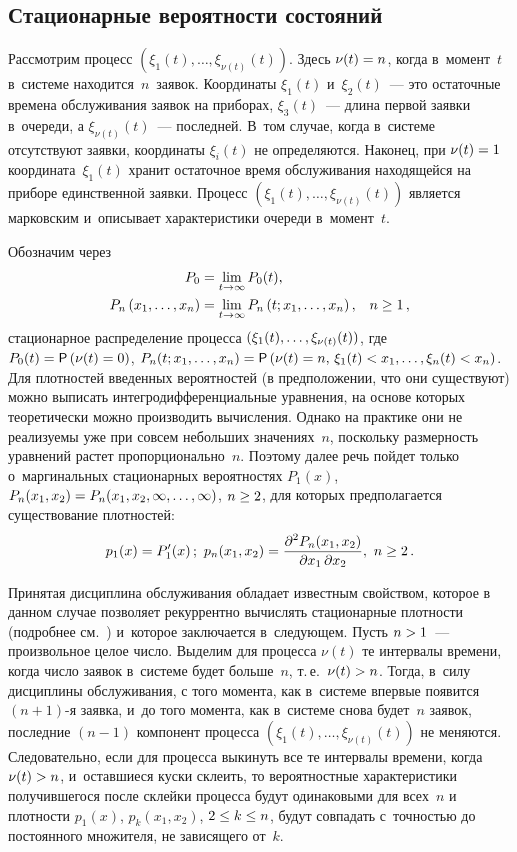 \begin{multicols}{2}
\section{Стационарные вероятности состояний}


Рассмотрим процесс $(\xi_{1}(t),\ldots,\xi_{\nu(t)}(t))$.
Здесь $\nu(t)\hm=n$, когда в~момент~$t$ в~системе находится~$n$~заявок. 
Координаты $\xi_{1}(t)$ и~$\xi_{2}(t)$~--- это
остаточные времена обслуживания заявок на приборах,
$\xi_{3}(t)$~--- длина первой заявки в~очереди, а
$\xi_{\nu(t)}(t)$~--- последней.
В~том случае, когда в~системе отсутствуют заявки, 
координаты $\xi_i(t)$ не определяются.
Наконец, при $\nu(t)\hm=1$ координата~$\xi_{1}(t)$
хранит остаточное время обслуживания находящейся на приборе 
единственной заявки.
Процесс $(\xi_{1}(t),\ldots,\xi_{\nu(t)}(t))$
является марковским и~описывает характеристики очереди в~момент~$t$.

Обозначим через
\begin{align*}
P_{0}&=
\lim\limits_{t\to\infty}
P_{0}(t),
\\
P_{n}\left(x_1,\ldots,x_{n}\right)
&=
\lim\limits_{t\to\infty}
P_{n}\left(t;x_1,\ldots,x_{n}\right),\enskip \ n\ge 1\,,
\end{align*}
\noindent стационарное распределение процесса 
$(\xi_{1}(t),\hm\ldots,\xi_{\nu(t)}(t))$,
где $P_{0}(t)\hm=\mathsf{P} \left (\nu(t)\hm=0 \right )$,
$P_{n}(t;x_1,\hm\ldots,x_{n})\hm=\mathsf{P}\left (\nu(t)\hm=n,\, 
\xi_{1}(t)<x_{1},\hm\ldots,\xi_{n}(t)\hm<x_{n} \right )$.
Для плотностей введенных вероятностей (в предположении, что они 
существуют)
можно выписать интегродифференциальные уравнения, на основе которых 
теоретически можно производить вы\-чис\-ле\-ния. Однако на практике 
они не реализуемы уже при совсем небольших значениях~$n$,
поскольку размерность уравнений растет пропорционально~$n$.
%
Поэтому далее речь пойдет только о~маргинальных стационарных вероятностях
$P_{1}(x)$, $P_{n}(x_1,x_2)\hm=P_{n}(x_1,x_2,\infty,\ldots,\infty)$, $n 
\hm\ge 2$,
для которых предполагается существование плотностей: 
$$
p_1(x)=P'_{1}(x)\,;\ 
p_n(x_1,x_2)=\fr{\partial^2 P_{n}(x_1,x_2)}{\partial x_1\, \partial 
x_2},\ n \ge 2\,.
$$

Принятая дисциплина обслуживания обладает известным свойством, которое 
в данном случае позволяет рекуррентно вычислять стационарные плотности
(подробнее см.~\cite{xx1}) и~которое заключается в~следующем.
Пусть $n\hm>1$~--- произвольное целое число. Выделим для процесса
$\nu(t)$ те интервалы времени, когда число заявок в~системе будет 
больше~$n$, т.\,е.\ $\nu(t)\hm>n$. Тогда, в~силу дисциплины обслуживания, 
с того момента, как в~системе впервые появится 
$(n+1)$-я заявка, и~до того момента, как в~системе снова будет~$n$
заявок, последние $(n-1)$ компонент процесса 
$(\xi_{1}(t),\ldots,\xi_{\nu(t)}(t))$
не меняются. Следовательно, если для процесса 
выкинуть все те интервалы времени, когда $\nu(t)\hm>n$,
и~оставшиеся куски склеить, то вероятностные характеристики 
получившегося после склейки процесса будут одинаковыми для всех~$n$
и плотности 
$p_1(x)$, $p_k(x_1,x_2)$, $2 \hm\le k \hm\le n$, 
будут совпадать с~точностью до постоянного множителя, не зависящего 
от~$k$.


\end{multicols}
